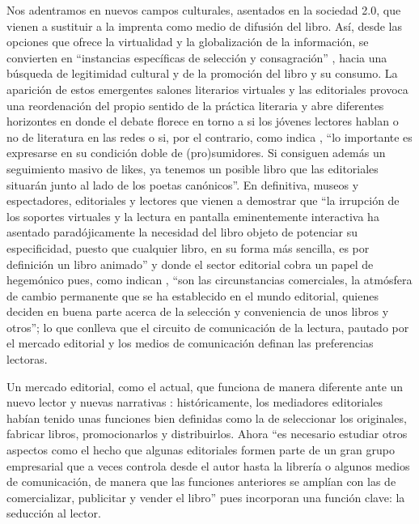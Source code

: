 \documentclass[spanish]{textolivre}
\begin{document}
Nos adentramos en nuevos campos culturales, asentados en la sociedad 2.0, que vienen a sustituir a la imprenta como medio de difusión del libro. Así, desde las opciones que ofrece la virtualidad y la globalización de la información, se convierten en “instancias específicas de selección y consagración” \cite[p.49]{canclini2020lectores}, hacia una búsqueda de legitimidad cultural y de la promoción del libro y su consumo. La aparición de estos emergentes salones literarios virtuales y las editoriales provoca una reordenación del propio sentido de la práctica literaria y abre diferentes horizontes en donde el debate florece en torno a si los jóvenes lectores hablan o no de literatura en las redes o si, por el contrario, como indica \textcite[p.142]{garcia2021literatura}, “lo importante es expresarse en su condición doble de (pro)sumidores. Si consiguen además un seguimiento masivo de likes, ya tenemos un posible libro que las editoriales situarán junto al lado de los poetas canónicos”. En definitiva, museos y espectadores, editoriales y lectores \cite{canclini2020lectores} que vienen a demostrar que “la irrupción de los soportes virtuales y la lectura en pantalla eminentemente interactiva ha asentado paradójicamente la necesidad del libro objeto de potenciar su especificidad, puesto que cualquier libro, en su forma más sencilla, es por definición un libro animado” \cite[p.10-11]{taberneroellibro} y donde el sector editorial cobra un papel de hegemónico pues, como indican \textcite[p.70]{duenas_lorente_clasicos_2013}, “son las circunstancias comerciales, la atmósfera de cambio permanente que se ha establecido en el mundo editorial, quienes deciden en buena parte acerca de la selección y conveniencia de unos libros y otros”; lo que conlleva que el circuito de comunicación de la lectura, pautado por el mercado editorial y los medios de comunicación definan las preferencias lectoras. 

Un mercado editorial, como el actual, que funciona de manera diferente ante un nuevo lector y nuevas narrativas \cite{lluchliteraturainfantil,lluch2010lecturas}: históricamente, los mediadores editoriales habían tenido unas funciones bien definidas como la de seleccionar los originales, fabricar libros, promocionarlos y distribuirlos. Ahora “es necesario estudiar otros aspectos como el hecho que algunas editoriales formen parte de un gran grupo empresarial que a veces controla desde el autor hasta la librería o algunos medios de comunicación, de manera que las funciones anteriores se amplían con las de comercializar, publicitar y vender el libro” \cite[p.31]{lluch2003analisis} pues incorporan una función clave: la seducción al lector. 
\end{document}

